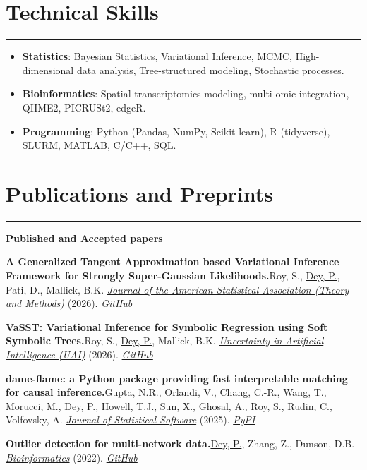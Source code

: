 \documentclass[11pt]{article}
\newcommand{\me}{\uline{Dey, P.}}
\newcommand{\SectionRule}{\vspace{-0.3em}\noindent\rule{\linewidth}{1.2pt}\vspace{0.6em}}
\begin{document}
\section*{Technical Skills}
\SectionRule
\begin{itemize}[leftmargin=*]
  \item \textbf{Statistics}: Bayesian Statistics, Variational Inference, MCMC, High-dimensional data analysis, Tree-structured modeling, Stochastic processes.
  \item \textbf{Bioinformatics}: Spatial transcriptomics modeling, multi-omic integration, QIIME2, PICRUSt2, edgeR.
  \item \textbf{Programming}: Python (Pandas, NumPy, Scikit-learn), R (tidyverse), SLURM, MATLAB, C/C++, SQL.
\end{itemize}

\section*{Publications and Preprints}
\SectionRule

\textbf{\large Published and Accepted papers}
\begin{etaremune}

  \item \textbf{A Generalized Tangent Approximation based Variational Inference Framework for Strongly Super-Gaussian Likelihoods.}\quad  Roy, S., \me, Pati, D., Mallick, B.K. \href{https://doi.org/10.1080/01621459.2026.2749698}{\textit{Journal of the American Statistical Association (Theory and Methods)}} (2026). \href{https://github.com/Roy-SR-007/TAVIE-SSG}{\textit{GitHub}}
  
  \item \textbf{VaSST: Variational Inference for Symbolic Regression using Soft Symbolic Trees.}\quad  Roy, S., \me, Mallick, B.K. \href{https://proceedings.mlr.press/v337/roy26a.html}{\textit{Uncertainty in Artificial Intelligence (UAI)}} (2026). \href{https://github.com/Roy-SR-007/VaSST}{\textit{GitHub}}
  
  \item \textbf{dame-flame: a Python package providing fast interpretable matching for causal inference.}\quad  Gupta, N.R., Orlandi, V., Chang, C.-R., Wang, T., Morucci, M., \me, Howell, T.J., Sun, X., Ghosal, A., Roy, S., Rudin, C., Volfovsky, A. \href{https://doi.org/10.18637/jss.v113.i02}{\textit{Journal of Statistical Software}} (2025). \href{https://pypi.org/project/dame-flame/}{\textit{PyPI}}

  \item \textbf{Outlier detection for multi-network data.}\quad  \me, Zhang, Z., Dunson, D.B. \href{https://doi.org/10.1093/bioinformatics/btac431}{\textit{Bioinformatics}} (2022). \href{https://github.com/pritamdey/ODIN-python}{\textit{GitHub}}
\end{etaremune}
\end{document}
